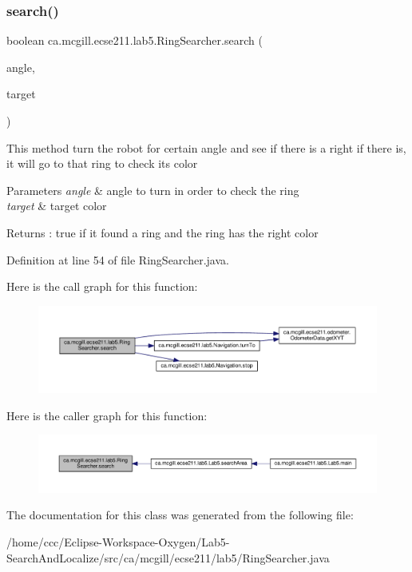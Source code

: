 \subsubsection{\texorpdfstring{search()}{search()}}
{\footnotesize\ttfamily boolean ca.\+mcgill.\+ecse211.\+lab5.\+Ring\+Searcher.\+search (\begin{DoxyParamCaption}\item[{int}]{angle,  }\item[{Color\+Calibrator.\+Color}]{target }\end{DoxyParamCaption})}

This method turn the robot for certain angle and see if there is a right if there is, it will go to that ring to check its color


\begin{DoxyParams}{Parameters}
{\em angle} & angle to turn in order to check the ring \\
\hline
{\em target} & target color \\
\hline
\end{DoxyParams}
\begin{DoxyReturn}{Returns}
\+: true if it found a ring and the ring has the right color 
\end{DoxyReturn}


Definition at line 54 of file Ring\+Searcher.\+java.

Here is the call graph for this function\+:
\nopagebreak
\begin{figure}[H]
\begin{center}
\leavevmode
\includegraphics[width=350pt]{classca_1_1mcgill_1_1ecse211_1_1lab5_1_1_ring_searcher_a88a4c77f3c76d74edc8bfd0229f0902f_cgraph}
\end{center}
\end{figure}
Here is the caller graph for this function\+:
\nopagebreak
\begin{figure}[H]
\begin{center}
\leavevmode
\includegraphics[width=350pt]{classca_1_1mcgill_1_1ecse211_1_1lab5_1_1_ring_searcher_a88a4c77f3c76d74edc8bfd0229f0902f_icgraph}
\end{center}
\end{figure}


The documentation for this class was generated from the following file\+:\begin{DoxyCompactItemize}
\item 
/home/ccc/\+Eclipse-\/\+Workspace-\/\+Oxygen/\+Lab5-\/\+Search\+And\+Localize/src/ca/mcgill/ecse211/lab5/Ring\+Searcher.\+java\end{DoxyCompactItemize}
